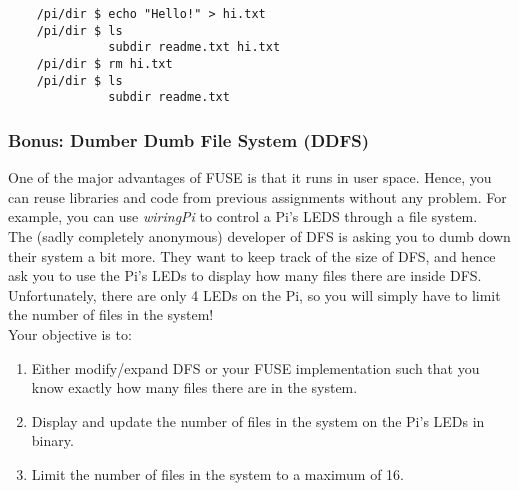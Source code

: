 \documentclass [a4,twoside,11pt] {article}
\begin{document}
    \begin{verbatim}
    /pi/dir $ echo "Hello!" > hi.txt
    /pi/dir $ ls
              subdir readme.txt hi.txt
    /pi/dir $ rm hi.txt
    /pi/dir $ ls
              subdir readme.txt\end{verbatim}

    \subsubsection{Bonus: Dumber Dumb File System (DDFS)}
    
    One of the major advantages of FUSE is that it runs in user space. Hence, you can reuse libraries and code from previous assignments without any problem. For example, you can use \textit{wiringPi} to control a Pi's LEDS through a file system.\\
    
    The (sadly completely anonymous) developer of DFS is asking you to dumb down their system a bit more. They want to keep track of the size of DFS, and hence ask you to use the Pi's LEDs to display how many files there are inside DFS. Unfortunately, there are only 4 LEDs on the Pi, so you will simply have to limit the number of files in the system!\\

    Your objective is to:

    \begin{enumerate}
        \item Either modify/expand DFS or your FUSE implementation such that you know exactly how many files there are in the system.
        \item Display and update the number of files in the system on the Pi's LEDs in binary.
        \item Limit the number of files in the system to a maximum of 16.
    \end{enumerate}
\end{document}
